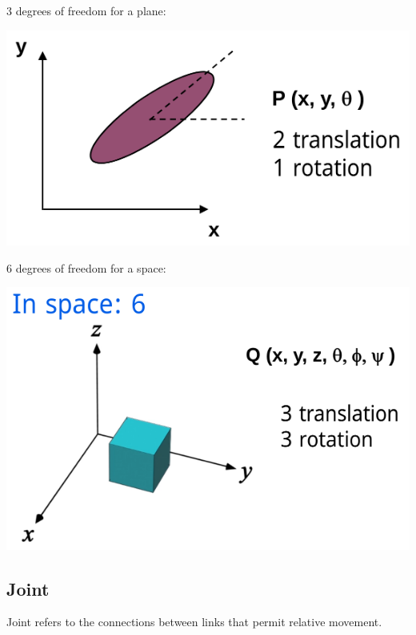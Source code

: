 \documentclass[11pt]{article}
\begin{document}
3 degrees of freedom for a plane:
\begin{center}
\includegraphics[width=.9\linewidth]{./images/links-plane-degrees-of-freedom-image.png}
\end{center}

6 degrees of freedom for a space:
\begin{center}
\includegraphics[width=.9\linewidth]{./images/links-space-degrees-of-freedom-image.png}
\end{center}
\subsection{Joint}
\label{sec:orgebd33de}
Joint refers to the connections between links that permit relative movement.
\end{document}
